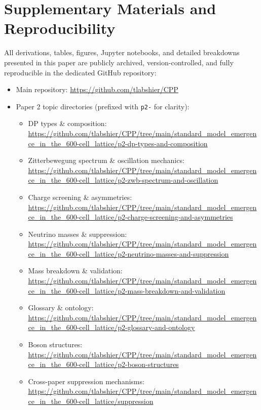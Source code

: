 \documentclass{article}
\begin{document}
\section*{Supplementary Materials and Reproducibility}

All derivations, tables, figures, Jupyter notebooks, and detailed breakdowns presented in this paper are publicly archived, version-controlled, and fully reproducible in the dedicated GitHub repository:

\begin{itemize}
    \item Main repository: \url{https://github.com/tlabshier/CPP}
    \item Paper 2 topic directories (prefixed with \texttt{p2-} for clarity):
    \begin{itemize}
        \item DP types \& composition: \url{https://github.com/tlabshier/CPP/tree/main/standard_model_emergence_in_the_600-cell_lattice/p2-dp-types-and-composition}
        \item Zitterbewegung spectrum \& oscillation mechanics: \url{https://github.com/tlabshier/CPP/tree/main/standard_model_emergence_in_the_600-cell_lattice/p2-zwb-spectrum-and-oscillation}
        \item Charge screening \& asymmetries: \url{https://github.com/tlabshier/CPP/tree/main/standard_model_emergence_in_the_600-cell_lattice/p2-charge-screening-and-asymmetries}
        \item Neutrino masses \& suppression: \url{https://github.com/tlabshier/CPP/tree/main/standard_model_emergence_in_the_600-cell_lattice/p2-neutrino-masses-and-suppression}
        \item Mass breakdown \& validation: \url{https://github.com/tlabshier/CPP/tree/main/standard_model_emergence_in_the_600-cell_lattice/p2-mass-breakdown-and-validation}
        \item Glossary \& ontology: \url{https://github.com/tlabshier/CPP/tree/main/standard_model_emergence_in_the_600-cell_lattice/p2-glossary-and-ontology}
        \item Boson structures: \url{https://github.com/tlabshier/CPP/tree/main/standard_model_emergence_in_the_600-cell_lattice/p2-boson-structures}
        \item Cross-paper suppression mechanisms: \url{https://github.com/tlabshier/CPP/tree/main/standard_model_emergence_in_the_600-cell_lattice/suppression}
    \end{itemize}
\end{itemize}
\end{document}
